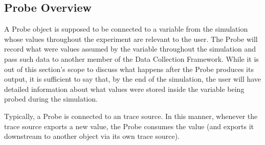 \documentclass[letterpaper,10pt,english]{sphinxmanual}
\begin{document}
\subsection{Probe Overview}
\label{\detokenize{probe:probe-overview}}
A Probe object is supposed to be connected to a variable from the
simulation whose values throughout the experiment are relevant to the user.
The Probe will record what were values assumed by the variable throughout
the simulation and pass such data to another member of the Data Collection
Framework.  While it is out of this section’s scope to discuss what happens
after the Probe produces its output, it is sufficient to say that, by the
end of the simulation, the user will have detailed information about what
values were stored inside the variable being probed during the simulation.

Typically, a Probe is connected to an  trace source.  In this manner,
whenever the trace source exports a new value, the Probe consumes the
value (and exports it downstream to another object via its own trace source).
\end{document}
